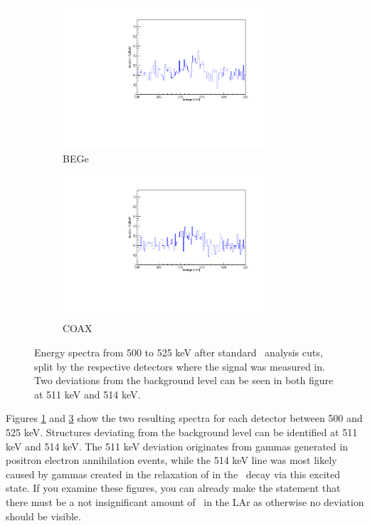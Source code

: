 \documentclass[encoding=utf8,british]{tumphthesis}
\begin{document}
\begin{figure}[t!]
\centering
\begin{subfigure}{.475\textwidth}
  \centering
	\includegraphics[width=75mm]{./Bilder/500525NoFilterBEGes.pdf}

  \caption{BEGe}
    \label{fig:NoFilterBEGes}
\end{subfigure}\hfill%
\begin{subfigure}{.475\textwidth}
  \centering
	\includegraphics[width=75mm]{./Bilder/500525NoFilterCOAX.pdf}
  \caption{COAX}
  \label{fig:NoFilterCOAX}
\end{subfigure}
	\caption{Energy spectra from 500 to 525 keV after standard \gerda\ analysis cuts, split by the respective detectors where the signal was measured in. Two deviations from the background level can be seen in both figure at 511 keV and 514 keV.}
			\vspace{5mm}
\end{figure}

Figures \ref{fig:NoFilterBEGes} and \ref{fig:NoFilterCOAX} show the two resulting spectra for each detector between 500 and 525 keV.
Structures deviating from the background level can be identified  at 511 keV and 514 keV.
The 511 keV deviation originates from gammas generated in positron electron annihilation events, while the 514 keV line was most likely caused by gammas created in the relaxation of  in the \Kr\ decay via this excited state.
If you examine these figures, you can already make the statement that there must be a not insignificant amount of \Kr\ in the LAr as otherwise no deviation should be visible.
\\
\end{document}
